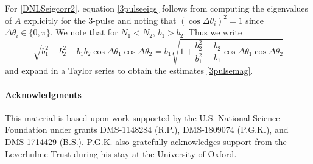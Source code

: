 \documentclass[12pt]{elsarticle}
\begin{document}
For \cref{DNLSeigcorr2}, equation \cref{3pulseeigs} follows from computing the eigenvalues of $A$ explicitly for the 3-pulse and noting that $(\cos \Delta \theta_i)^2 = 1$ since $\Delta \theta_i \in \{0, \pi\}$. We note that for $N_1 < N_2$, $b_1 > b_2$. Thus we write
\[
\sqrt{b_1^2 + b_2^2 - b_1 b_2\cos\Delta\theta_1 \cos\Delta\theta_2} = b_1
\sqrt{1 + \frac{b_2^2}{b_1^2} - \frac{b_2}{b_1} \cos\Delta\theta_1 \cos\Delta\theta_2} 
\]
and expand in a Taylor series to obtain the estimates \cref{3pulsemag}.

\paragraph{Acknowledgments}

This material is based upon work supported by the U.S. National Science Foundation under grants DMS-1148284 (R.P.), DMS-1809074 (P.G.K.), and DMS-1714429 (B.S.). P.G.K. also gratefully acknowledges support from the Leverhulme
Trust during his stay at the University of Oxford.

% 

\end{document}
